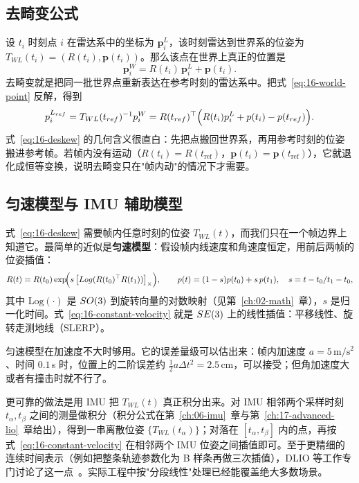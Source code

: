 \subsection{去畸变公式}

设 $t_i$ 时刻点 $i$ 在雷达系中的坐标为 $\bm{p}_i^{L}$，该时刻雷达到世界系的位姿为 $T_{WL}(t_i)=(R(t_i),\bm{p}(t_i))$。那么该点在世界上真正的位置是
\begin{equation}\label{eq:16-world-point}
  \bm{p}_i^{W}=R(t_i)\,\bm{p}_i^{L}+\bm{p}(t_i).
\end{equation}
去畸变就是把同一批世界点重新表达在参考时刻的雷达系中。把式~\eqref{eq:16-world-point} 反解，得到
\begin{equation}\label{eq:16-deskew}
  p_i^{L_{ref}}=T_{WL}(t_{ref})^{-1}p_i^{W}
  =R(t_{ref})^{\top}\Bigl(R(t_i)p_i^{L}+p(t_i)-p(t_{ref})\Bigr).
\end{equation}
式~\eqref{eq:16-deskew} 的几何含义很直白：先把点搬回世界系，再用参考时刻的位姿搬进参考帧。若帧内没有运动（$R(t_i)=R(t_{\mathrm{ref}})$，$\bm{p}(t_i)=\bm{p}(t_{\mathrm{ref}})$），它就退化成恒等变换，说明去畸变只在"帧内动"的情况下才需要。

\subsection{匀速模型与 IMU 辅助模型}

式~\eqref{eq:16-deskew} 需要帧内任意时刻的位姿 $T_{WL}(t)$，而我们只在一个帧边界上知道它。最简单的近似是\textbf{匀速模型}：假设帧内线速度和角速度恒定，用前后两帧的位姿插值：
\begin{equation}\label{eq:16-constant-velocity}
  R(t)=R(t_0)\exp\!\Bigl(s\,\bigl[Log(R(t_0)^{\top}R(t_1))\bigr]_\times\Bigr),\qquad
  p(t)=(1-s)p(t_0)+s\,p(t_1),\quad s=t-t_0/t_1-t_0,
\end{equation}
其中 $\mathrm{Log}(\cdot)$ 是 $SO(3)$ 到旋转向量的对数映射（见第~\ref{ch:02-math}~章），$s$ 是归一化时间。式~\eqref{eq:16-constant-velocity} 就是 $SE(3)$ 上的线性插值：平移线性、旋转走测地线（SLERP）。

匀速模型在加速度不大时够用。它的误差量级可以估出来：帧内加速度 $a=5\,\mathrm{m/s^2}$、时间 $0.1$\,s 时，位置上的二阶误差约 $\frac12 a \Delta t^2=2.5$\,cm，可以接受；但角加速度大或者有撞击时就不行了。

更可靠的做法是用 IMU 把 $T_{WL}(t)$ 真正积分出来。对 IMU 相邻两个采样时刻 $t_\alpha,t_\beta$ 之间的测量做积分（积分公式在第~\ref{ch:06-imu}~章与第~\ref{ch:17-advanced-lio}~章给出），得到一串离散位姿 $\{T_{WL}(t_\alpha)\}$；对落在 $[t_\alpha,t_\beta]$ 内的点，再按式~\eqref{eq:16-constant-velocity} 在相邻两个 IMU 位姿之间插值即可。至于更精细的连续时间表示（例如把整条轨迹参数化为 B 样条再做三次插值），DLIO 等工作专门讨论了这一点~\cite{chen2023dlio}。实际工程中按"分段线性"处理已经能覆盖绝大多数场景。

